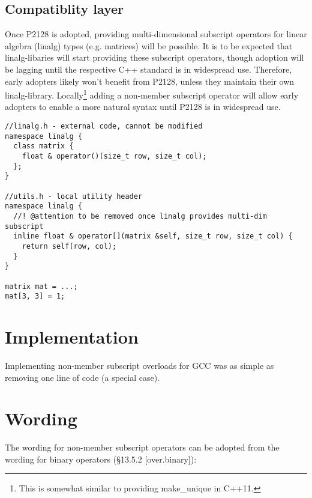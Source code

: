 \subsection{Compatiblity layer}
Once P2128 is adopted, providing multi\hyp dimensional subscript operators for linear algebra (linalg) types (e.g. matrices) will be possible.
It is to be expected that linalg\hyp libaries will start providing these subscript operators, though adoption will be lagging until the respective C++ standard is in widespread use.
Therefore, early adopters likely won't benefit from P2128, unless they maintain their own linalg\hyp library.
Locally\footnote{This is somewhat similar to providing make_unique in C++11.} adding a non\hyp member subscript operator will allow early adopters to enable a more natural syntax until P2128 is in widespread use.

\begin{lstlisting}[style=Vc]
//linalg.h - external code, cannot be modified
namespace linalg {
  class matrix {
    float & operator()(size_t row, size_t col);
  };
}

//utils.h - local utility header
namespace linalg {
  //! @attention to be removed once linalg provides multi-dim subscript
  inline float & operator[](matrix &self, size_t row, size_t col) {
    return self(row, col);
  }
}

matrix mat = ...;
mat[3, 3] = 1;

\end{lstlisting}

\section{Implementation}
Implementing non-member subscript overloads for GCC was as simple as removing one line of code (a special case).

\section{Wording}

The wording for non\hyp member subscript operators can be adopted from the wording for binary operators (§13.5.2 [over.binary]):

